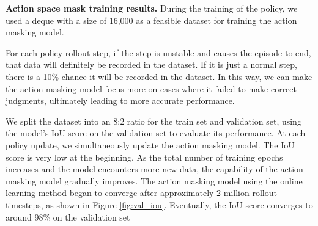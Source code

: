 \begin{table*}[t]
    \centering
    \caption{Performance evaluation of different planners under various methods.}
    \label{tab:final performance}
    \setlength{\tabcolsep}{12pt}
    \vspace{-6pt}
\end{table*}

\textbf{Action space mask training results. }
During the training of the policy, we used a deque with a size of 16,000 as a feasible dataset for training the action masking model.

For each policy rollout step, if the step is unstable and causes the episode to end, that data will definitely be recorded in the dataset. If it is just a normal step, there is a 10\% chance it will be recorded in the dataset. In this way, we can make the action masking model focus more on cases where it failed to make correct judgments, ultimately leading to more accurate performance.

We split the dataset into an 8:2 ratio for the train set and validation set, using the model's IoU score on the validation set to evaluate its performance.
At each policy update, we simultaneously update the action masking model. 
The IoU score is very low at the beginning. As the total number of training epochs increases and the model encounters more new data, the capability of the action masking model gradually improves. The action masking model using the online learning method began to converge after approximately 2 million rollout timesteps, as shown in Figure \ref{fig:val_iou}. Eventually, the IoU score converges to around 98\% on the validation set

